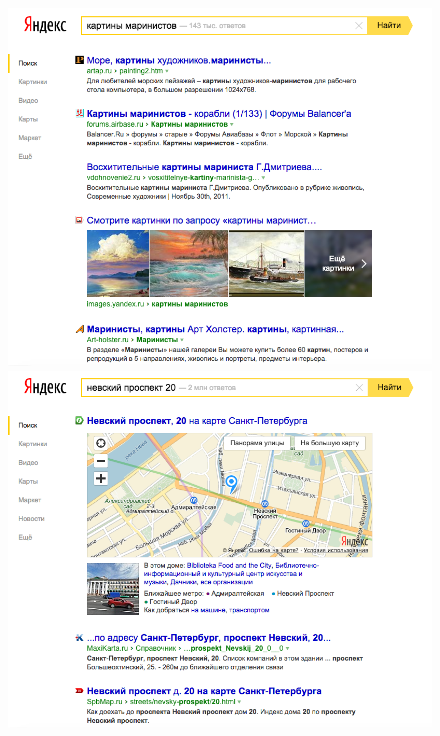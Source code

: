 \documentclass[12pt,a4paper]{report}
\begin{document}
\begin{figure}[b!]
  \centering
  \includegraphics[height=0.3\textheight]{pics/VerticalResults-Images-Yandex.png}
  \includegraphics[height=0.3\textheight]{pics/VerticalResults-Maps-Yandex.png}
  \vfill\vfill

\end{figure}
\end{document}
